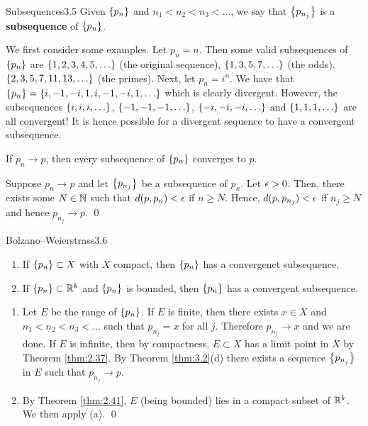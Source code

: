 \setcounter{rudin}{4}
\begin{definition}{Subsequences}{3.5}
    Given $\set{p_n}$ and $n_1 < n_2 < n_3 < \ldots$, we say that $\set{p_{n_j}}$ is a \textbf{subsequence} of $\set{p_n}$.
\end{definition}

\noindent We first consider some examples. Let $p_n = n$. Then some valid subsequences of $\set{p_n}$ are $\set{1, 2, 3, 4, 5, \ldots}$ (the original sequence), $\set{1, 3, 5, 7, \ldots}$ (the odds), $\set{2, 3, 5, 7, 11, 13, \ldots}$ (the primes). Next, let $p_n = i^n$. We have that $\set{p_n} = \set{i, -1, -i, 1, i, -1, -i, 1, \ldots}$ which is clearly divergent. However, the subsequences $\set{i, i, i, \ldots}$, $\set{-1, -1, -1, \ldots}$, $\set{-i, -i, -i, \ldots}$ and $\set{1, 1, 1, \ldots}$ are all convergent! It is hence possible for a divergent sequence to have a convergent subsequence.

\begin{nlemma}{}{}
    If $p_n \rightarrow p$, then every subsequence of $\set{p_n}$ converges to $p$. 
\end{nlemma}

\begin{nproof}
    Suppose $p_n \rightarrow p$ and let $\set{p_{n_j}}$ be a subsequence of $p_n$. Let $\epsilon > 0$. Then, there exists some $N \in \mathbb{N}$ such that $d(p, p_n) < \epsilon$ if $n \geq N$. Hence, $d(p, p_{n_j}) < \epsilon$ if $n_j \geq N$ and hence $p_{n_j} \rightarrow p$. \qed
\end{nproof}

\begin{theorem}{Bolzano–Weierstrass}{3.6}
    \begin{enumerate}
        \item If $\set{p_n} \subset X$ with $X$ compact, then $\set{p_n}$ has a convergenct subsequence.
        \item If $\set{p_n} \subset \mathbb{R}^k$ and $\set{p_n}$ is bounded, then $\set{p_n}$ has a convergent subsequence.
    \end{enumerate}
\end{theorem}
\begin{nproof}
    \begin{enumerate}
        \item Let $E$ be the range of $\set{p_n}$. If $E$ is finite, then there exists $x \in X$ and $n_1 < n_2 < n_3 < \ldots$ such that $p_{n_j} = x$ for all $j$. Therefore $p_{n_j} \rightarrow x$ and we are done. If $E$ is infinite, then by compactness, $E \subset X$ has a limit point in $X$ by Theorem \ref{thm:2.37}. By Theorem \ref{thm:3.2}(d) there exists a sequence $\set{p_{n_j}}$ in $E$ such that $p_{n_j} \rightarrow p$.
        \item By Theorem \ref{thm:2.41}, $E$ (being bounded) lies in a compact subset of $\mathbb{R}^k$. We then apply (a). \qed
    \end{enumerate}
\end{nproof}

